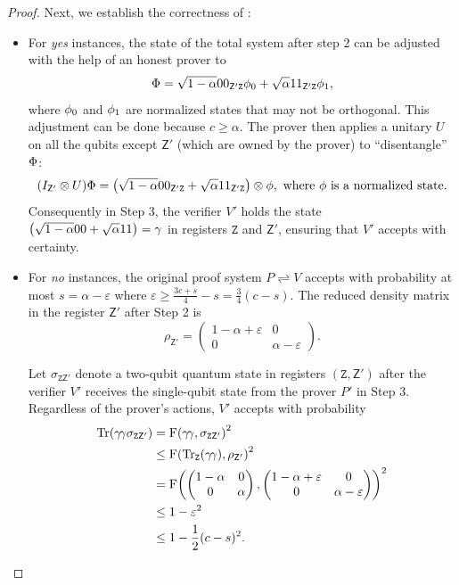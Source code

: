 \documentclass[10pt,a4paper]{article}
\numberwithin{equation}{section}
\numberwithin{figure}{section}
\newcommand{\protocol}[2]{{#1}\!\rightleftharpoons\!{#2}}
\DeclarePairedDelimiter\rbra{\lparen}{\rparen}
\let\ket\relax\DeclarePairedDelimiter\ket{\lvert}{\rangle}
\let\bra\relax\DeclarePairedDelimiter\bra{\langle}{\rvert}
\newcommand{\ketbra}[2]{\ensuremath{\ket{#1}\!\bra{#2}}}
\newcommand{\Tr}{\mathrm{Tr}}
\newcommand{\F}{\mathrm{F}}
\newcommand{\sfZ}{\mathsf{Z}}
\newcommand{\ttZ}{\mathtt{Z}}
\begin{document}
\begin{proof}
    Next, we establish the correctness of : 
    \begin{itemize}[leftmargin=2em]
        \item For \textit{yes} instances, the state of the total system after step 2 can be adjusted with the help of an honest prover to
        \[\ket{\Phi} = \sqrt{1-\alpha} \ket{00}_{\sfZ'\ttZ}\ket{\phi_0} + \sqrt{\alpha} \ket{11}_{\sfZ'\ttZ}\ket{\phi_1},\]
        where $\ket{\phi_0}$ and $\ket{\phi_1}$ are normalized states that may not be orthogonal. 
        This adjustment can be done because $c\geq\alpha$. The prover then applies a unitary $U$ on all the qubits except $\sfZ'$ (which are owned by the prover) to ``disentangle'' $\ket{\Phi}$: 
        \[ (I_{\sfZ'}\otimes U) \ket{\Phi} = \rbra*{\sqrt{1-\alpha} \ket{00}_{\sfZ'\ttZ} + \sqrt{\alpha} \ket{11}_{\sfZ'\ttZ}} \otimes \ket{\phi}, \text{ where } \ket{\phi} \text{ is a normalized state.} \]
        Consequently in Step 3, the verifier $V'$ holds the state 
        $\rbra*{\sqrt{1-\alpha} \ket{00} + \sqrt{\alpha} \ket{11}} = \ket{\gamma}$ in registers $\ttZ$ and $\sfZ'$, ensuring that $V'$ accepts with certainty. 

        \item For \textit{no} instances, the original proof system $\protocol{P}{V}$ accepts with probability at most $s = \alpha - \varepsilon$ where $\varepsilon \geq  \frac{3c+s}{4} -s = \frac{3}{4}(c-s)$. The reduced density matrix in the register $\sfZ'$ after Step 2 is 
        \[  \rho_{\sfZ'} = \begin{pmatrix} 
            1-\alpha+\varepsilon & 0\\ 0 & \alpha-\varepsilon
        \end{pmatrix}.\]
        
        Let $\sigma_{\ttZ\sfZ'}$ denote a two-qubit quantum state in registers $(\ttZ,\sfZ')$ after the verifier $V'$ receives the single-qubit state from the prover $P'$ in Step 3. 
        Regardless of the prover's actions, $V'$ accepts with probability 
        \begin{align*}
            \Tr\rbra*{\ketbra{\gamma}{\gamma}\sigma_{\ttZ\sfZ'}} 
            &= \F\rbra*{\ketbra{\gamma}{\gamma}, \sigma_{\ttZ\sfZ'}}^2 \\
            &\leq \F\rbra*{\Tr_{\ttZ}\rbra*{\ketbra{\gamma}{\gamma}}, \rho_{\sfZ'}}^2 \\
            &= \F\rbra*{\begin{pmatrix} 
                    1-\alpha & 0\\ 0 & \alpha
                \end{pmatrix},
                \begin{pmatrix} 
                    1-\alpha+\varepsilon & 0\\ 0 & \alpha-\varepsilon
                \end{pmatrix}}^2\\
            &\leq 1-\varepsilon^2\\
            &\leq 1 - \frac{1}{2}(c-s)^2.
        \end{align*}


\end{itemize}
\end{proof}
\end{document}
